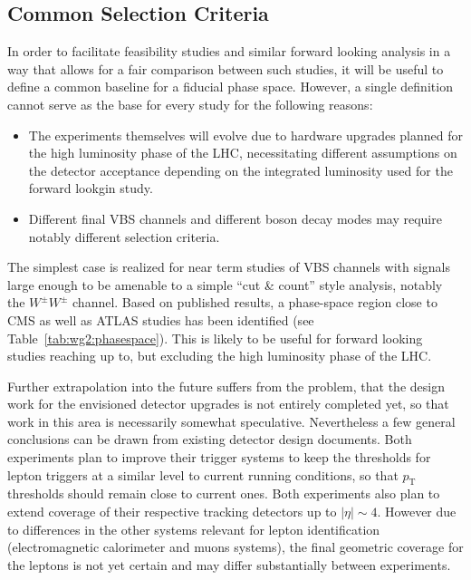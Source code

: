 \subsection{Common Selection Criteria}

In order to facilitate feasibility studies and similar forward looking analysis in a way that allows for a fair comparison between such studies, it will be useful to define a common baseline for a fiducial phase space. However, a single definition cannot serve as the base for every study for the following reasons:
\begin{itemize}
\item The experiments themselves will evolve due to hardware upgrades planned for the high luminosity phase of the LHC, necessitating different assumptions on the detector acceptance depending on the integrated luminosity used for the forward lookgin study.
\item Different final VBS channels and different boson decay modes may require notably different selection criteria.
\end{itemize}

The simplest case is realized for near term studies of VBS channels with signals large enough to be amenable to a simple ``cut \& count'' style analysis, notably the $W^\pm W^\pm$ channel. Based on published results, a phase-space region close to CMS as well as ATLAS studies has been identified (see Table~\ref{tab:wg2:phasespace}). This is likely to be useful for forward looking studies reaching up to, but excluding the high luminosity phase of the LHC.

Further extrapolation into the future suffers from the problem, that the design work for the envisioned detector upgrades is not entirely completed yet, so that work in this area is necessarily somewhat speculative. Nevertheless a few general conclusions can be drawn from existing detector design documents. Both experiments plan to improve their trigger systems to keep the thresholds for lepton triggers at a similar level to current running conditions, so that $p_{\mathrm{T}}$ thresholds should remain close to current ones. Both experiments also plan to extend coverage of their respective tracking detectors up to $|\eta|\sim 4$. However due to differences in the other systems relevant for lepton identification (electromagnetic calorimeter and muons systems), the final geometric coverage for the leptons is not yet certain and may differ substantially between experiments.

